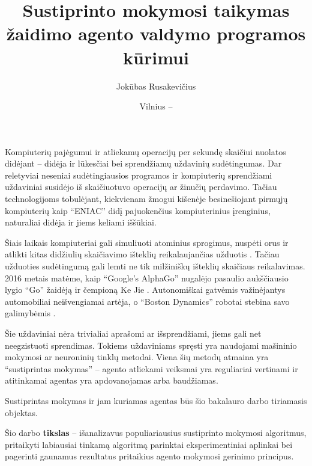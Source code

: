 \documentclass{VUMIFPSbakalaurinis}
\title{Sustiprinto mokymosi taikymas žaidimo agento valdymo programos kūrimui}
\author{Jokūbas Rusakevičius}
\date{Vilnius – \the\year}
\begin{document}
\maketitle

\setcounter{page}{2}


Kompiuterių pajėgumui ir atliekamų operacijų per sekundę skaičiui nuolatos didėjant -- didėja ir lūkesčiai bei sprendžiamų uždavinių sudėtingumas. Dar reletyviai neseniai sudėtingiausios programos ir kompiuterių sprendžiami uždaviniai susidėjo iš skaičiuotuvo operacijų ar žinučių perdavimo. Tačiau technologijoms tobulėjant, kiekvienam žmogui kišenėje besinešiojant pirmųjų kompiuterių kaip \enquote{ENIAC} \cite{computer_history} didį pajuokenčius kompiuterinius įrenginius, naturaliai didėja ir jiems keliami iššūkiai. \par

Šiais laikais kompiuteriai gali simuliuoti atominius sprogimus, nuspėti orus ir atlikti kitas didžiulių skaičiavimo išteklių reikalaujančias užduotis \cite{supercomputers}. Tačiau užduoties sudėtingumą gali lemti ne tik milžiniškų išteklių skaičiaus reikalavimas. 2016 metais matėme, kaip \enquote{Google’s AlphaGo} nugalėjo pasaulio aukščiausio lygio \enquote{Go} žaidėją ir čempioną Ke Jie \cite{go}. Autonomiškai gatvėmis važinėjantys automobiliai neišvengiamai artėja, o \enquote{Boston Dynamics} robotai stebina savo galimybėmis \cite{bostondynamics}. \par

Šie uždaviniai nėra trivialiai aprašomi ar išsprendžiami, jiems gali net neegzistuoti sprendimas. Tokiems uždaviniams spręsti yra naudojami mašininio mokymosi ar neuroninių tinklų metodai. Viena šių metodų atmaina yra \enquote{sustiprintas mokymas} -- agento atliekami veiksmai yra reguliariai vertinami ir atitinkamai agentas yra apdovanojamas arba baudžiamas. \par

Sustiprintas mokymas ir jam kuriamas agentas būs šio bakalauro darbo tiriamasis objektas.



Šio darbo \textbf{tikslas} -- išanalizavus populiariausius sustiprinto mokymosi algoritmus, pritaikyti labiausiai tinkamą algoritmą parinktai eksperimentiniai aplinkai bei pagerinti gaunamus rezultatus pritaikius agento mokymosi gerinimo principus.\par
\end{document}
